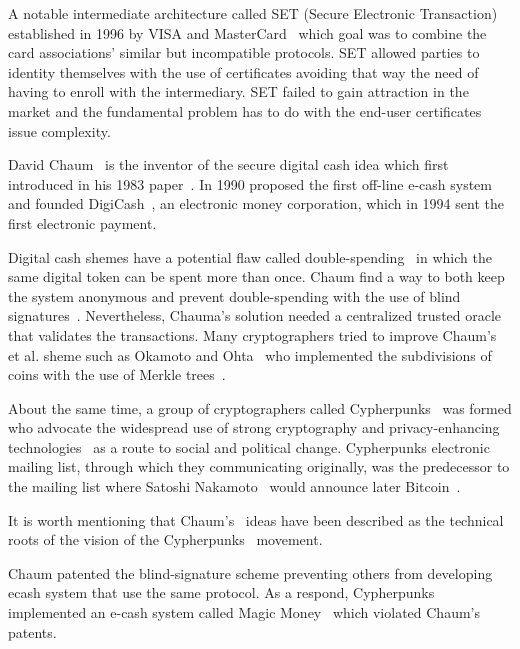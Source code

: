 A notable intermediate architecture called SET (Secure Electronic Transaction) established in 1996 by VISA and MasterCard~\cite{wiki:set}
which goal was to combine the card associations' similar but incompatible protocols. SET allowed parties to identity themselves with the use of
certificates avoiding that way the need of having to enroll with the intermediary. SET failed to gain attraction in the market and the fundamental
problem has to do with the end-user certificates issue complexity.

David Chaum~\cite{wiki:david_chaum} is the inventor of the secure digital cash idea which first introduced in his 1983 paper~\cite{Chaum1983}. In
1990 proposed the first off-line e-cash system~\cite{Chaum:1988:UEC:646753.704915} and founded DigiCash~\cite{wiki:digicash}, an electronic money corporation,
which in 1994 sent the first electronic payment.

Digital cash shemes have a potential flaw called double-spending~\cite{wiki:double_spend} in which the same digital token can be spent more than once.
Chaum find a way to both keep the system anonymous and prevent double-spending with the use of blind signatures~\cite{Chaum1983,Chaum:1988:UEC:646753.704915}.
Nevertheless, Chauma's solution needed a centralized trusted oracle that validates the transactions. Many cryptographers tried to improve Chaum's et al. sheme
such as Okamoto and Ohta~\cite{Watanabe1996} who implemented the subdivisions of coins with the use of Merkle trees~\cite{wiki:merkle_tree}.

About the same time, a group of cryptographers called Cypherpunks~\cite{wiki:cypherpunk,cypherpunks_manifesto} was formed who advocate the widespread
use of strong cryptography and privacy-enhancing technologies~\cite{cypherpunks_manifesto} as a route to social and political change. Cypherpunks electronic mailing list,
through which they communicating originally, was the predecessor to the mailing list where Satoshi Nakamoto~\cite{wiki:satoshi_nakamoto} would announce later Bitcoin~\cite{nakamoto2012bitcoin}.

It is worth mentioning that Chaum's~\cite{wiki:david_chaum} ideas have been described as the technical roots of the vision of the Cypherpunks~\cite{wiki:cypherpunk}
movement.

Chaum patented the blind-signature scheme preventing others from developing ecash system that use the same protocol. As a respond,
Cypherpunks implemented an e-cash system called Magic Money~\cite{magic_money} which violated Chaum's patents.

